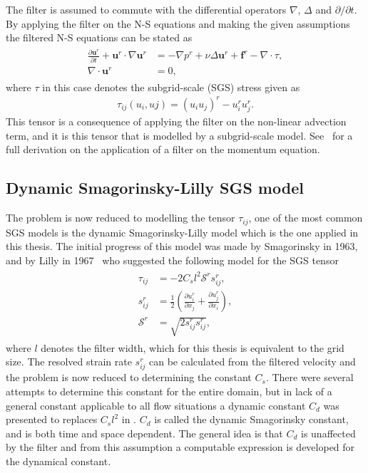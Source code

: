 The filter is assumed to commute with 
the differential operators $\nabla$, $\Delta$ and $\partial / \partial t$. By applying the filter on the N-S equations
and making the given assumptions the filtered N-S equations can be stated as 
%
\begin{align}
    \begin{split}
        \frac{\partial \mathbf{u}^r}{\partial t} + \mathbf{u}^r\cdot \nabla\mathbf{u}^r
        &= -\nabla p^r +\nu\Delta \mathbf{u}^r+\mathbf{f}^r-\nabla \cdot \tau, \\
        \nabla \cdot \mathbf{u}^r &= 0,
    \end{split}
	\label{eq:NSfiltered}
\end{align}
%
where $\tau$ in this case denotes the subgrid-scale (SGS) stress given as 
\begin{align}
    \tau_{ij}(u_i,uj) = (u_iu_j)^r -u_i^ru_j^r.
    \label{eq:sgstensor}
\end{align}
%
This tensor is a consequence of applying the filter on the non-linear advection term, 
and it is this tensor that is modelled by a subgrid-scale model. See~\cite{Pope} for a full derivation on the 
application of a filter on the momentum equation. 

\subsection{Dynamic Smagorinsky-Lilly SGS model}
The problem is now reduced to modelling the tensor $\tau_{ij}$, one of the most common SGS models is the 
dynamic Smagorinsky-Lilly model which is the one applied in this thesis. 
The initial progress of this model was made by Smagorinsky in 1963,
and by Lilly in 1967~\cite{Lilly67} who suggested the following model for the SGS tensor
%
\begin{align}
    \begin{split}
    \tau_{ij} &= -2C_sl^2\mathcal{S}^rs_{ij}^r,\\
    s^r_{ij} &= \frac{1}{2}\left( \frac{\partial u^r_i}{\partial x_j} +
    \frac{\partial u^r_j}{\partial x_i}\right),\\
    \mathcal{S}^r &= \sqrt{2s^r_{ij}s^r_{ij}},
    \end{split}
    \label{eq:boussinesq}
\end{align}
%
where $l$ denotes the filter width, which for this thesis is equivalent to the grid size.
The resolved strain rate $s^r_{ij}$ can be calculated from the filtered velocity and the problem is now reduced to determining
the constant $C_s$. There were several attempts to determine this constant for the entire domain, but in lack of a general 
constant applicable to all flow situations a dynamic constant $C_d$ was presented to replaces $C_sl^2$ in .
$C_d$ is called the dynamic Smagorinsky constant, and is both time and space dependent.
The general idea is that $C_d$ is unaffected by the filter and from this 
assumption a computable expression is developed for the dynamical constant.

